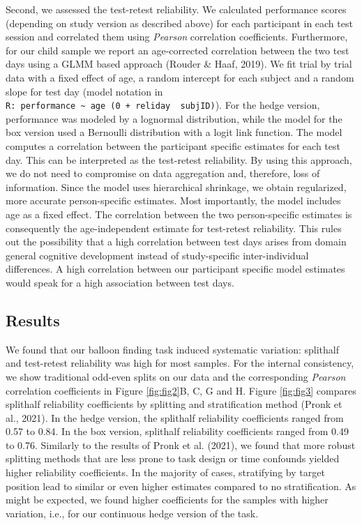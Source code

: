\documentclass[
  man,floatsintext]{apa6}
\begin{document}
Second, we assessed the test-retest reliability. We calculated performance scores (depending on study version as described above) for each participant in each test session and correlated them using \emph{Pearson} correlation coefficients. Furthermore, for our child sample we report an age-corrected correlation between the two test days using a GLMM based approach (Rouder \& Haaf, 2019). We fit trial by trial data with a fixed effect of age, a random intercept for each subject and a random slope for test day (model notation in \texttt{R:\ performance\ \textasciitilde{}\ age\ (0\ +\ reliday\ \textbar{}\ subjID)}). For the hedge version, performance was modeled by a lognormal distribution, while the model for the box version used a Bernoulli distribution with a logit link function. The model computes a correlation between the participant specific estimates for each test day. This can be interpreted as the test-retest reliability. By using this approach, we do not need to compromise on data aggregation and, therefore, loss of information. Since the model uses hierarchical shrinkage, we obtain regularized, more accurate person-specific estimates. Most importantly, the model includes age as a fixed effect. The correlation between the two person-specific estimates is consequently the age-independent estimate for test-retest reliability. This rules out the possibility that a high correlation between test days arises from domain general cognitive development instead of study-specific inter-individual differences. A high correlation between our participant specific model estimates would speak for a high association between test days.

\hypertarget{results-1}{%
\subsection{Results}\label{results-1}}

We found that our balloon finding task induced systematic variation: splithalf and test-retest reliability was high for most samples. For the internal consistency, we show traditional odd-even splits on our data and the corresponding \emph{Pearson} correlation coefficients in Figure \ref{fig:fig2}B, C, G and H. Figure \ref{fig:fig3} compares splithalf reliability coefficients by splitting and stratification method (Pronk et al., 2021).
In the hedge version, the splithalf reliability coefficients ranged from 0.57 to 0.84. In the box version, splithalf reliability coefficients ranged from 0.49 to 0.76.
Similarly to the results of Pronk et al. (2021), we found that more robust splitting methods that are less prone to task design or time confounds yielded higher reliability coefficients. In the majority of cases, stratifying by target position lead to similar or even higher estimates compared to no stratification. As might be expected, we found higher coefficients for the samples with higher variation, i.e., for our continuous hedge version of the task.
\end{document}
